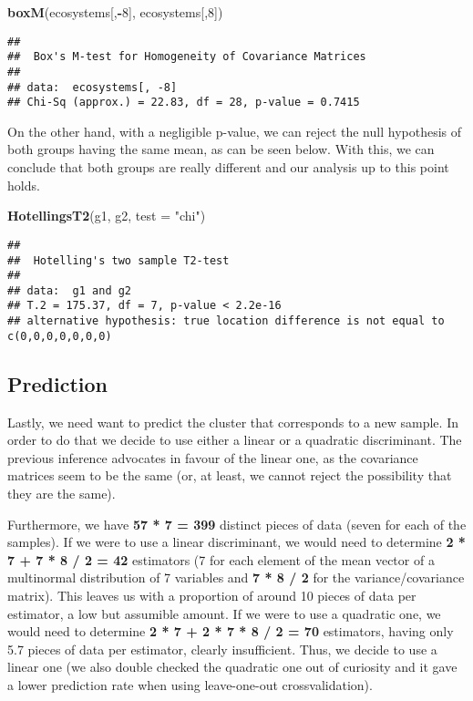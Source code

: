 \documentclass[]{article}
\newenvironment{Shaded}{\begin{snugshade}}{\end{snugshade}}
\newcommand{\KeywordTok}[1]{\textcolor[rgb]{0.13,0.29,0.53}{\textbf{#1}}}
\newcommand{\DataTypeTok}[1]{\textcolor[rgb]{0.13,0.29,0.53}{#1}}
\newcommand{\DecValTok}[1]{\textcolor[rgb]{0.00,0.00,0.81}{#1}}
\newcommand{\StringTok}[1]{\textcolor[rgb]{0.31,0.60,0.02}{#1}}
\newcommand{\OperatorTok}[1]{\textcolor[rgb]{0.81,0.36,0.00}{\textbf{#1}}}
\newcommand{\NormalTok}[1]{#1}
\begin{document}
\begin{Shaded}
\begin{Highlighting}[]
\KeywordTok{boxM}\NormalTok{(ecosystems[,}\OperatorTok{-}\DecValTok{8}\NormalTok{], ecosystems[,}\DecValTok{8}\NormalTok{])}
\end{Highlighting}
\end{Shaded}

\begin{verbatim}
## 
##  Box's M-test for Homogeneity of Covariance Matrices
## 
## data:  ecosystems[, -8]
## Chi-Sq (approx.) = 22.83, df = 28, p-value = 0.7415
\end{verbatim}

On the other hand, with a negligible p-value, we can reject the null
hypothesis of both groups having the same mean, as can be seen below.
With this, we can conclude that both groups are really different and our
analysis up to this point holds.

\begin{Shaded}
\begin{Highlighting}[]
\KeywordTok{HotellingsT2}\NormalTok{(g1, g2, }\DataTypeTok{test =} \StringTok{"chi"}\NormalTok{)}
\end{Highlighting}
\end{Shaded}

\begin{verbatim}
## 
##  Hotelling's two sample T2-test
## 
## data:  g1 and g2
## T.2 = 175.37, df = 7, p-value < 2.2e-16
## alternative hypothesis: true location difference is not equal to c(0,0,0,0,0,0,0)
\end{verbatim}

\subsection{Prediction}\label{prediction}

Lastly, we need want to predict the cluster that corresponds to a new
sample. In order to do that we decide to use either a linear or a
quadratic discriminant. The previous inference advocates in favour of
the linear one, as the covariance matrices seem to be the same (or, at
least, we cannot reject the possibility that they are the same).

Furthermore, we have \textbf{57 * 7 = 399} distinct pieces of data
(seven for each of the samples). If we were to use a linear
discriminant, we would need to determine \textbf{2 * 7 + 7 * 8 / 2 = 42}
estimators (7 for each element of the mean vector of a multinormal
distribution of 7 variables and \textbf{7 * 8 / 2} for the
variance/covariance matrix). This leaves us with a proportion of around
10 pieces of data per estimator, a low but assumible amount. If we were
to use a quadratic one, we would need to determine \textbf{2 * 7 + 2 * 7
* 8 / 2 = 70} estimators, having only 5.7 pieces of data per estimator,
clearly insufficient. Thus, we decide to use a linear one (we also
double checked the quadratic one out of curiosity and it gave a lower
prediction rate when using leave-one-out crossvalidation).
\end{document}
